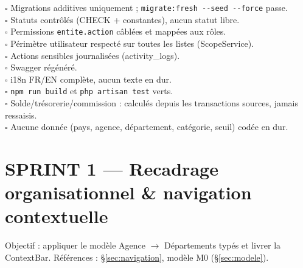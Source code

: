 \documentclass[11pt,a4paper]{article}
\newcommand{\critere}{$\square$ }
\begin{document}
\critere Migrations additives uniquement ; \verb|migrate:fresh --seed --force| passe. \\
\critere Statuts contrôlés (CHECK + constantes), aucun statut libre. \\
\critere Permissions \verb|entite.action| câblées et mappées aux rôles. \\
\critere Périmètre utilisateur respecté sur toutes les listes (ScopeService). \\
\critere Actions sensibles journalisées (activity\_logs). \\
\critere Swagger régénéré. \\
\critere i18n FR/EN complète, aucun texte en dur. \\
\critere \verb|npm run build| et \verb|php artisan test| verts. \\
\critere Solde/trésorerie/commission : calculés depuis les transactions sources, jamais ressaisis. \\
\critere Aucune donnée (pays, agence, département, catégorie, seuil) codée en dur.

\section{SPRINT 1 --- Recadrage organisationnel \& navigation contextuelle}

Objectif : appliquer le modèle Agence $\rightarrow$ Départements typés et livrer la ContextBar. Références : §\ref{sec:navigation}, modèle M0 (§\ref{sec:modele}).
\end{document}
